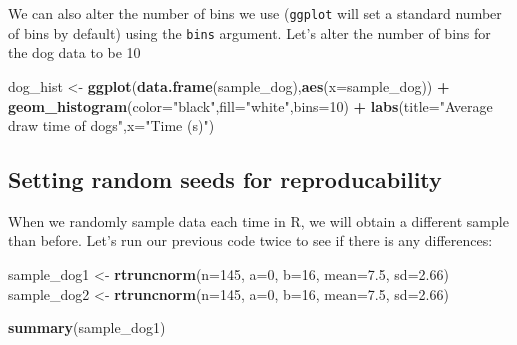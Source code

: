 \documentclass[
]{book}
\newenvironment{Shaded}{\begin{snugshade}}{\end{snugshade}}
\newcommand{\DataTypeTok}[1]{\textcolor[rgb]{0.13,0.29,0.53}{#1}}
\newcommand{\DecValTok}[1]{\textcolor[rgb]{0.00,0.00,0.81}{#1}}
\newcommand{\FloatTok}[1]{\textcolor[rgb]{0.00,0.00,0.81}{#1}}
\newcommand{\KeywordTok}[1]{\textcolor[rgb]{0.13,0.29,0.53}{\textbf{#1}}}
\newcommand{\NormalTok}[1]{#1}
\newcommand{\OperatorTok}[1]{\textcolor[rgb]{0.81,0.36,0.00}{\textbf{#1}}}
\newcommand{\StringTok}[1]{\textcolor[rgb]{0.31,0.60,0.02}{#1}}
\begin{document}
We can also alter the number of bins we use (\texttt{ggplot} will set a standard number of bins by default) using the \texttt{bins} argument. Let's alter the number of bins for the dog data to be 10

\begin{Shaded}
\begin{Highlighting}[]
\NormalTok{dog_hist <-}\StringTok{ }\KeywordTok{ggplot}\NormalTok{(}\KeywordTok{data.frame}\NormalTok{(sample_dog),}\KeywordTok{aes}\NormalTok{(}\DataTypeTok{x=}\NormalTok{sample_dog)) }\OperatorTok{+}\StringTok{ }\KeywordTok{geom_histogram}\NormalTok{(}\DataTypeTok{color=}\StringTok{"black"}\NormalTok{,}\DataTypeTok{fill=}\StringTok{"white"}\NormalTok{,}\DataTypeTok{bins=}\DecValTok{10}\NormalTok{) }\OperatorTok{+}\StringTok{ }
\StringTok{  }\KeywordTok{labs}\NormalTok{(}\DataTypeTok{title=}\StringTok{"Average draw time of dogs"}\NormalTok{,}\DataTypeTok{x=}\StringTok{"Time (s)"}\NormalTok{)}
\end{Highlighting}
\end{Shaded}

\hypertarget{setting-random-seeds-for-reproducability}{%
\subsection{Setting random seeds for reproducability}\label{setting-random-seeds-for-reproducability}}

When we randomly sample data each time in R, we will obtain a different sample than before. Let's run our previous code twice to see if there is any differences:

\begin{Shaded}
\begin{Highlighting}[]
\NormalTok{sample_dog1 <-}\StringTok{ }\KeywordTok{rtruncnorm}\NormalTok{(}\DataTypeTok{n=}\DecValTok{145}\NormalTok{, }\DataTypeTok{a=}\DecValTok{0}\NormalTok{, }\DataTypeTok{b=}\DecValTok{16}\NormalTok{, }\DataTypeTok{mean=}\FloatTok{7.5}\NormalTok{, }\DataTypeTok{sd=}\FloatTok{2.66}\NormalTok{)}
\NormalTok{sample_dog2 <-}\StringTok{ }\KeywordTok{rtruncnorm}\NormalTok{(}\DataTypeTok{n=}\DecValTok{145}\NormalTok{, }\DataTypeTok{a=}\DecValTok{0}\NormalTok{, }\DataTypeTok{b=}\DecValTok{16}\NormalTok{, }\DataTypeTok{mean=}\FloatTok{7.5}\NormalTok{, }\DataTypeTok{sd=}\FloatTok{2.66}\NormalTok{)}

\KeywordTok{summary}\NormalTok{(sample_dog1)}
\end{Highlighting}
\end{Shaded}
\end{document}
